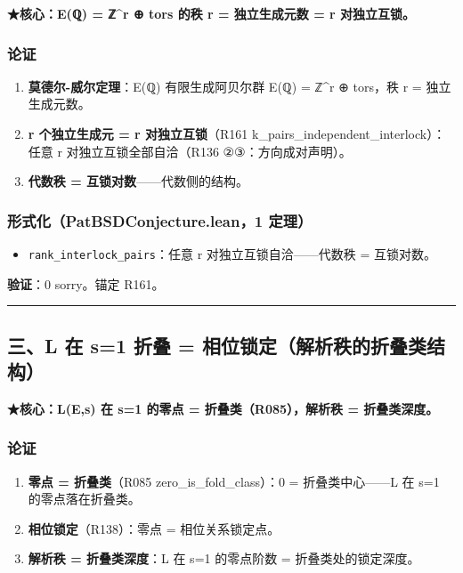 \documentclass[
]{article}
\providecommand{\tightlist}{%
 \setlength{\itemsep}{0pt}\setlength{\parskip}{0pt}}
\begin{document}
\textbf{★核心：E(ℚ) = ℤ\^{}r ⊕ tors 的秩 r = 独立生成元数 = r
对独立互锁。}

\subsubsection{论证}\label{ux8bbaux8bc1-1}

\begin{enumerate}
\def\labelenumi{\arabic{enumi}.}
\tightlist
\item
 \textbf{莫德尔-威尔定理}：E(ℚ) 有限生成阿贝尔群 E(ℚ) = ℤ\^{}r ⊕
 tors，秩 r = 独立生成元数。
\item
 \textbf{r 个独立生成元 = r 对独立互锁}（R161
 k\_pairs\_independent\_interlock）：任意 r 对独立互锁全部自洽（R136
 ②③：方向成对声明）。
\item
 \textbf{代数秩 = 互锁对数}------代数侧的结构。
\end{enumerate}

\subsubsection{形式化（PatBSDConjecture.lean，1
定理）}\label{ux5f62ux5f0fux5316patbsdconjecture.lean1-ux5b9aux7406-1}

\begin{itemize}
\tightlist
\item
 \texttt{rank\_interlock\_pairs}：任意 r 对独立互锁自洽------代数秩 =
 互锁对数。
\end{itemize}

\textbf{验证}：0 sorry。锚定 R161。

\begin{center}\rule{0.5\linewidth}{0.5pt}\end{center}

\subsection{三、L 在 s=1 折叠 =
相位锁定（解析秩的折叠类结构）}\label{ux4e09l-ux5728-s1-ux6298ux53e0-ux76f8ux4f4dux9501ux5b9aux89e3ux6790ux79e9ux7684ux6298ux53e0ux7c7bux7ed3ux6784}

\textbf{★核心：L(E,s) 在 s=1 的零点 = 折叠类（R085），解析秩 =
折叠类深度。}

\subsubsection{论证}\label{ux8bbaux8bc1-2}

\begin{enumerate}
\def\labelenumi{\arabic{enumi}.}
\tightlist
\item
 \textbf{零点 = 折叠类}（R085 zero\_is\_fold\_class）：0 =
 折叠类中心------L 在 s=1 的零点落在折叠类。
\item
 \textbf{相位锁定}（R138）：零点 = 相位关系锁定点。
\item
 \textbf{解析秩 = 折叠类深度}：L 在 s=1 的零点阶数 =
 折叠类处的锁定深度。
\end{enumerate}
\end{document}
